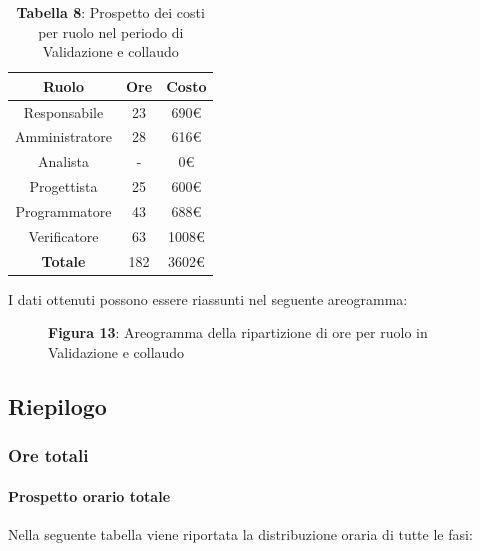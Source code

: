 \begin{table}[H]
	\centering
	\renewcommand{\arraystretch}{1.5}
	\begin{tabular}{|c|c|c|}
		\hline
		\rowcolor{lighter-grayer}
Ruolo & Ore & Costo \\ \hline
Responsabile & 23 & 690\euro \\ \hline
Amministratore & 28 & 616\euro \\ \hline
Analista & - & 0\euro \\ \hline
Progettista & 25 & 600\euro \\ \hline
Programmatore & 43 & 688\euro \\ \hline
Verificatore & 63 & 1008\euro \\ \hline
\textbf{Totale} & 182 & 3602\euro \\ \hline
	\end{tabular}
\caption*{\textbf{Tabella 8}: Prospetto dei costi per ruolo nel periodo di Validazione e collaudo\\}
\end{table}

I dati ottenuti possono essere riassunti nel seguente areogramma:


\begin{figure}[H]
	\centering
	\caption*{\textbf{Figura 13}: Areogramma della ripartizione di ore per ruolo in Validazione e collaudo}
	\label{fig:Figura10}
\end{figure}

\subsection{Riepilogo}
\subsubsection{Ore totali}
\paragraph{Prospetto orario totale}
Nella seguente tabella viene riportata la distribuzione oraria di tutte le fasi:

